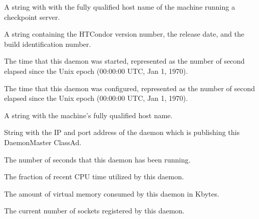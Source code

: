\begin{description}

\item[\AdAttr{CkptServer}:] A string with with the fully qualified
  host name of the machine running a checkpoint server.

\item[\AdAttr{CondorVersion}:] A string containing the HTCondor version
number, the release date, and the build identification number.

\item[\AdAttr{DaemonStartTime}:] The time that this daemon was
  started, represented as the number of second elapsed since
  the Unix epoch (00:00:00 UTC, Jan 1, 1970).

\item[\AdAttr{DaemonLastReconfigTime}:] The time that this daemon was
  configured, represented as the number of second elapsed since
  the Unix epoch (00:00:00 UTC, Jan 1, 1970).

\item[\AdAttr{Machine}:] A string with the machine's fully qualified 
  host name.

\item[\AdAttr{MasterIpAddr}:] String with the IP and port address of the
 daemon which is publishing this DaemonMaster ClassAd.

\item[\AdAttr{MonitorSelfAge}:] The number of seconds that this daemon
  has been running.

\item[\AdAttr{MonitorSelfCPUUsage}:] The fraction of recent CPU time utilized
  by this daemon. 

\item[\AdAttr{MonitorSelfImageSize}:] The amount of virtual memory consumed by
  this daemon in Kbytes.

\item[\AdAttr{MonitorSelfRegisteredSocketCount}:] The current number of sockets
  registered by this daemon.


\end{description}
